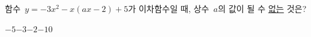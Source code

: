 함수~$y=-3x^2-x(ax-2)+5$가 이차함수일 때, 상수~$a$의 값이 될 수 \underline{없는} 것은?
\begin{choices32}{$-5$}{$-3$}{$-2$}{$-1$}{$0$}\end{choices32}
